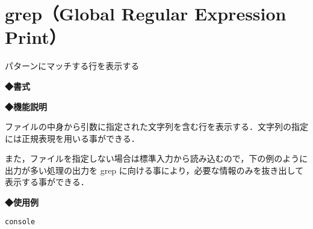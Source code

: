 
\section{grep（Global Regular Expression Print）}
パターンにマッチする行を表示する\par
\label{cmd:grep}
\noindent
{\bf ◆書式}
\begin{center}
\begin{screen}
\begin{alltt}
% grep 文字列 [ファイル名]
\end{alltt}
\end{screen}
\end{center}

\noindent
{\bf ◆機能説明}

ファイルの中身から引数に指定された文字列を含む行を表示する．文字列の指定には正規表現を用いる事ができる．\par
また，ファイルを指定しない場合は標準入力から読み込むので，下の例のように出力が多い処理の出力を grep に向ける事により，必要な情報のみを抜き出して表示する事ができる．

\noindent
{\bf ◆使用例}
\begin{center}
\begin{breakbox}
\begin{alltt}
% \underline{ls /dev | grep console}   （←/devの中からconsoleという文字列があれば表示する）
console
%
\end{alltt}
\end{breakbox}
\end{center}
\clearpage
